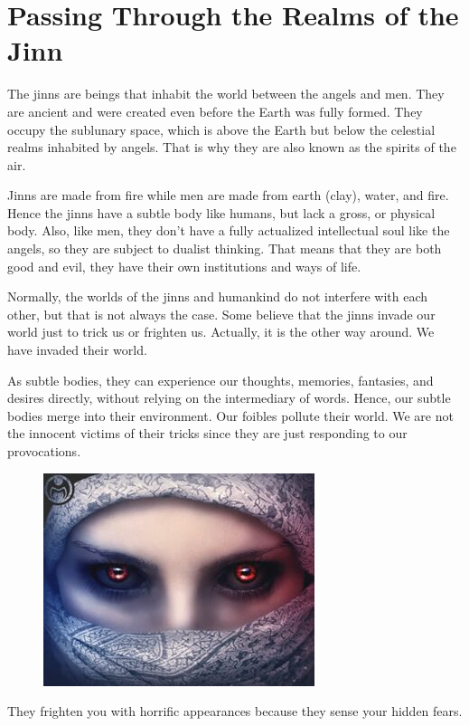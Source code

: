 \section{Passing Through the Realms of the Jinn}

The jinns are beings that inhabit the world between the angels and men. They are ancient and were created even before the Earth was fully formed. They occupy the sublunary space, which is above the Earth but below the celestial realms inhabited by angels. That is why they are also known as the spirits of the air.

Jinns are made from fire while men are made from earth (clay), water, and fire. Hence the jinns have a subtle body like humans, but lack a gross, or physical body. Also, like men, they don't have a fully actualized intellectual soul like the angels, so they are subject to dualist thinking. That means that they are both good and evil, they have their own institutions and ways of life.

Normally, the worlds of the jinns and humankind do not interfere with each other, but that is not always the case. Some believe that the jinns invade our world just to trick us or frighten us. Actually, it is the other way around. We have invaded their world.

As subtle bodies, they can experience our thoughts, memories, fantasies, and desires directly, without relying on the intermediary of words. Hence, our subtle bodies merge into their environment. Our foibles pollute their world. We are not the innocent victims of their tricks since they are just responding to our provocations.

\begin{figure}
\includegraphics[scale=.5]{a20210703PassingThroughtheRealmsoftheJinn-img001.jpg}
\end{figure}

They frighten you with horrific appearances because they sense your hidden fears.

